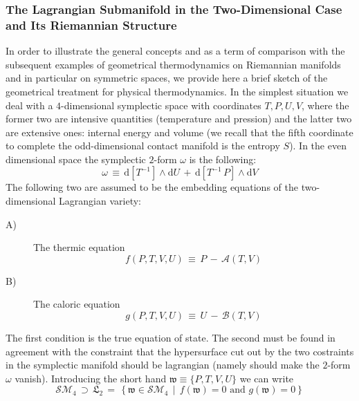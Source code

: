 \documentclass[10pt,a4paper]{article}
\begin{document}
\subsubsection{The Lagrangian Submanifold in the Two-Dimensional Case
and Its Riemannian Structure}
\label{biroccio}
In order to illustrate the general concepts and as a term of comparison with the subsequent examples of
geometrical thermodynamics on Riemannian manifolds and in particular on symmetric spaces, we provide here a brief
sketch of the geometrical treatment for physical thermodynamics. In the simplest situation we deal with a  $4$-dimensional symplectic space
with coordinates $T,P,U,V$, where the former two are intensive quantities (temperature and pression) and the latter two are extensive ones: internal energy and volume (we recall that the fifth coordinate to complete the odd-dimensional contact manifold is the entropy $S$). In the even dimensional space the symplectic $2$-form
$\omega$  is the following:
\begin{equation}\label{simpletformgen}
    \omega \, \equiv \,\mathrm{d}\left[T^{-1}\right ]\wedge \mathrm{d}U\, + \, \mathrm{d}\left[T^{-1}\,P\right]\wedge \mathrm{d}V
\end{equation}
 The following two are assumed to be the embedding equations of the two-dimensional Lagrangian variety:
\begin{description}
  \item[A)] The thermic equation
  \begin{equation}\label{termiceos}
    f(P,T,V,U)\, \equiv \, P\, - \,\mathcal{A}(T,V)
  \end{equation}\label{caloreos}
  \item[B)]The caloric equation
\begin{equation}\label{caloreos}
  g(P,T,V,U) \, \equiv \, U \, -\, \mathcal{B}(T,V)
\end{equation}
\end{description}
The first condition is the  true equation of state. The second must be found in agreement with the
constraint that the hypersurface cut out by the two costraints in the symplectic manifold should be lagrangian (namely should make the $2$-form $\omega$ vanish).
Introducing the short hand
$\mathfrak{w}\equiv\{P,T,V,U\}$ we can write
\begin{equation}\label{sottocoperta}
    \mathcal{SM}_4 \, \supset \, \mathfrak{L}_2 \, = \, \left\{\mathfrak{w}
    \in\mathcal{SM}_4 \, \mid \, f(\mathfrak{w})=0 \,\, \text{and} \,\,
    g(\mathfrak{w})=0\right\}
\end{equation}
\end{document}
